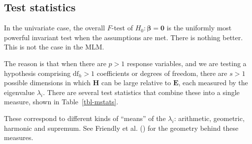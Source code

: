 \documentclass[
  letterpaper,
  10pt,
  krantz2]{krantz}
\begin{document}
{\subsection{Test statistics}\label{test-statistics}

In the univariate case, the overall \(F\)-test of
\(H_0: \boldsymbol{\beta} = \mathbf{0}\) is the uniformly most powerful
invariant test when the assumptions are met. There is nothing better.
This is not the case in the MLM.

The reason is that when there are \(p > 1\) response variables, and we
are testing a hypothesis comprising \(\text{df}_h >1\) coefficients or
degrees of freedom, there are \(s > 1\) possible dimensions in which
\(\mathbf{H}\) can be large relative to \(\mathbf{E}\), each measured by
the eigenvalue \(\lambda_i\). There are several test statistics that
combine these into a single measure, shown in Table~\ref{tbl-mstats}.

\begin{table}

\caption{\label{tbl-mstats}Test statistics for multivariate tests
combine the size of dimensions of \(\mathbf{H}\mathbf{E}^{-1}\) into a
single measure.}


\end{table}%

These correspond to different kinds of ``means'' of the \(\lambda_i\):
arithmetic, geometric, harmonic and supremum. See Friendly et al.
() for the geometry
behind these measures.

}
\end{document}
